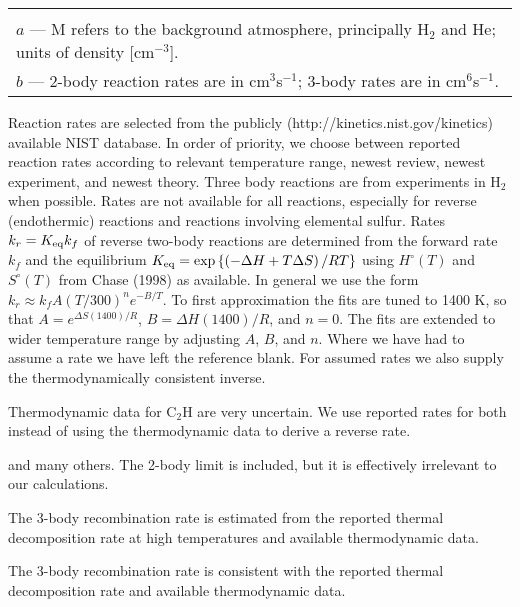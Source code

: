 \documentclass[12pt,landscape]{article}
\newcounter{reaction}
\begin{document}
\begin{longtable}{l lcl l p{3.5cm} }
\hline
\hline
\multicolumn{6}{l}{ }\\
\multicolumn{6}{l}{ $a$ --- M refers to the background atmosphere, principally H$_2$ and He; units of density [cm$^{-3}$].}\\
\multicolumn{6}{l}{$b$ --- 2-body reaction rates are in cm$^{3}$s$^{-1}$;  3-body rates are in cm$^{6}$s$^{-1}$.}\\
\end{longtable}  

\newpage


 Reaction rates are selected from the publicly (http://kinetics.nist.gov/kinetics) available NIST database.
In order of priority, we choose between reported reaction rates according to relevant temperature range, newest review, newest experiment, and newest theory.  
Three body reactions are from experiments in H$_2$ when possible.  
Rates are not available for all reactions, especially for reverse (endothermic) reactions and reactions involving elemental sulfur.
Rates $k_r=K_{\rm eq}k_f$ of reverse two-body reactions are determined from the forward rate $k_f$ and the equilibrium $K_{\rm eq}=\exp{\left\{\left(-\Delta H + T\Delta S\right)/RT\right\}}$ using $H^{\circ}(T)$ and $S^{\circ}(T)$ from Chase (1998) as available.  In general we use the form $k_r \approx k_f A \left(T/300\right)^n e^{-B/T}$.  To first approximation the fits are tuned to 1400 K, so that $A=e^{\Delta S(1400)/R}$, $B=\Delta H(1400)/R$, and $n=0$.  The fits are extended to wider temperature range by adjusting $A$, $B$, and $n$.
Where we have had to assume a rate we have left the reference blank.
For assumed rates we also supply the thermodynamically consistent inverse.

Thermodynamic data for C$_2$H are very uncertain.  We use reported rates for both instead of using the thermodynamic data to derive a reverse rate. 



 and many others.  The 2-body limit is included, but it is effectively irrelevant to our calculations.

 The 3-body recombination rate is estimated from the reported thermal decomposition rate at high temperatures and available thermodynamic data. 

 The 3-body recombination rate is consistent with the reported thermal decomposition rate and available thermodynamic data. 
\end{document}
